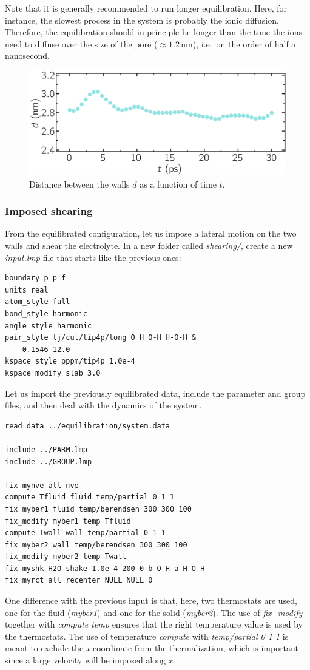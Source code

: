 \documentclass[9pt,tutorial]{livecoms}
\begin{document}
Note that it is generally recommended to run longer equilibration. Here, for
instance, the slowest process in the system is probably the ionic diffusion.
Therefore, the equilibration should in principle be longer than the time
the ions need to diffuse over the size of the pore ($\approx 1.2\,\text{nm}$),
i.e.~on the order of half a nanosecond.

\begin{figure}
\centering
\includegraphics[width=\linewidth]{NANOSHEAR-equilibration}
\caption{Distance between the walls $d$ as a function of time $t$.}
\label{fig:NANOSHEAR-equilibration}
\end{figure}

\subsubsection{Imposed shearing}

From the equilibrated configuration, let us impose a lateral motion on the two
walls and shear the electrolyte. In a new folder called \textit{shearing/},
create a new \textit{input.lmp} file that starts like the previous ones:
{\normalsize \begin{verbatim}
boundary p p f
units real
atom_style full
bond_style harmonic
angle_style harmonic
pair_style lj/cut/tip4p/long O H O-H H-O-H &
    0.1546 12.0
kspace_style pppm/tip4p 1.0e-4
kspace_modify slab 3.0
\end{verbatim}}
Let us import the previously equilibrated data, include the parameter and group
files, and then deal with the dynamics of the system.
{\normalsize \begin{verbatim}
read_data ../equilibration/system.data

include ../PARM.lmp
include ../GROUP.lmp

fix mynve all nve
compute Tfluid fluid temp/partial 0 1 1
fix myber1 fluid temp/berendsen 300 300 100
fix_modify myber1 temp Tfluid
compute Twall wall temp/partial 0 1 1
fix myber2 wall temp/berendsen 300 300 100
fix_modify myber2 temp Twall
fix myshk H2O shake 1.0e-4 200 0 b O-H a H-O-H
fix myrct all recenter NULL NULL 0
\end{verbatim}}
One difference with the previous input is that, here, two thermostats are used,
one for the fluid (\textit{myber1}) and one for the solid (\textit{myber2}).
The use of \textit{fix\_modify} together with \textit{compute temp} ensures
that the right temperature value is used by the thermostats. The use of
temperature \textit{compute} with \textit{temp/partial 0 1 1} is meant to exclude
the \textit{x} coordinate from the thermalization, which is important since a
large velocity will be imposed along \textit{x}.
\end{document}

